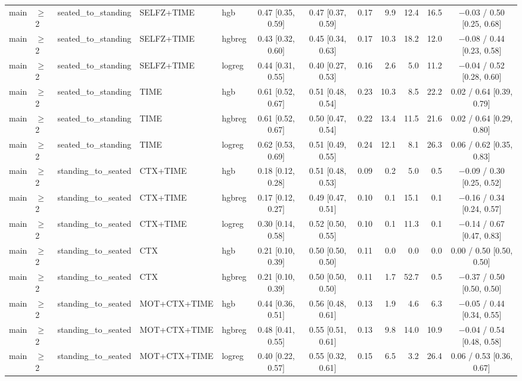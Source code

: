 \begin{longtable}{@{}lllllcccrrrc@{}}
main & $\geq$2 & seated\_to\_standing & SELFZ+TIME & hgb & 0.47 [0.35, 0.59] & 0.47 [0.37, 0.59] & 0.17 & 9.9 & 12.4 & 16.5 & $-$0.03 / 0.50 [0.25, 0.68] \\
main & $\geq$2 & seated\_to\_standing & SELFZ+TIME & hgbreg & 0.43 [0.32, 0.60] & 0.45 [0.34, 0.63] & 0.17 & 10.3 & 18.2 & 12.0 & $-$0.08 / 0.44 [0.23, 0.58] \\
main & $\geq$2 & seated\_to\_standing & SELFZ+TIME & logreg & 0.44 [0.31, 0.55] & 0.40 [0.27, 0.53] & 0.16 & 2.6 & 5.0 & 11.2 & $-$0.04 / 0.52 [0.28, 0.60] \\
main & $\geq$2 & seated\_to\_standing & TIME & hgb & 0.61 [0.52, 0.67] & 0.51 [0.48, 0.54] & 0.23 & 10.3 & 8.5 & 22.2 & 0.02 / 0.64 [0.39, 0.79] \\
main & $\geq$2 & seated\_to\_standing & TIME & hgbreg & 0.61 [0.52, 0.67] & 0.50 [0.47, 0.54] & 0.22 & 13.4 & 11.5 & 21.6 & 0.02 / 0.64 [0.29, 0.80] \\
main & $\geq$2 & seated\_to\_standing & TIME & logreg & 0.62 [0.53, 0.69] & 0.51 [0.49, 0.55] & 0.24 & 12.1 & 8.1 & 26.3 & 0.06 / 0.62 [0.35, 0.83] \\
main & $\geq$2 & standing\_to\_seated & CTX+TIME & hgb & 0.18 [0.12, 0.28] & 0.51 [0.48, 0.53] & 0.09 & 0.2 & 5.0 & 0.5 & $-$0.09 / 0.30 [0.25, 0.52] \\
main & $\geq$2 & standing\_to\_seated & CTX+TIME & hgbreg & 0.17 [0.12, 0.27] & 0.49 [0.47, 0.51] & 0.10 & 0.1 & 15.1 & 0.1 & $-$0.16 / 0.34 [0.24, 0.57] \\
main & $\geq$2 & standing\_to\_seated & CTX+TIME & logreg & 0.30 [0.14, 0.58] & 0.52 [0.50, 0.55] & 0.10 & 0.1 & 11.3 & 0.1 & $-$0.14 / 0.67 [0.47, 0.83] \\
main & $\geq$2 & standing\_to\_seated & CTX & hgb & 0.21 [0.10, 0.39] & 0.50 [0.50, 0.50] & 0.11 & 0.0 & 0.0 & 0.0 & 0.00 / 0.50 [0.50, 0.50] \\
main & $\geq$2 & standing\_to\_seated & CTX & hgbreg & 0.21 [0.10, 0.39] & 0.50 [0.50, 0.50] & 0.11 & 1.7 & 52.7 & 0.5 & $-$0.37 / 0.50 [0.50, 0.50] \\
main & $\geq$2 & standing\_to\_seated & MOT+CTX+TIME & hgb & 0.44 [0.36, 0.51] & 0.56 [0.48, 0.61] & 0.13 & 1.9 & 4.6 & 6.3 & $-$0.05 / 0.44 [0.34, 0.55] \\
main & $\geq$2 & standing\_to\_seated & MOT+CTX+TIME & hgbreg & 0.48 [0.41, 0.55] & 0.55 [0.51, 0.61] & 0.13 & 9.8 & 14.0 & 10.9 & $-$0.04 / 0.54 [0.48, 0.58] \\
main & $\geq$2 & standing\_to\_seated & MOT+CTX+TIME & logreg & 0.40 [0.22, 0.57] & 0.55 [0.32, 0.61] & 0.15 & 6.5 & 3.2 & 26.4 & 0.06 / 0.53 [0.36, 0.67] \\

\end{longtable}
